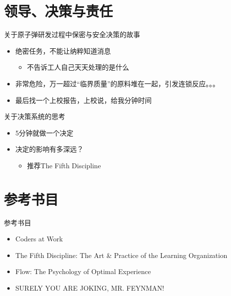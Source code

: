 \documentclass[presentation,dvipdfmx,CJKbookmarks]{beamer}
\begin{document}
\begin{CJK*}{UTF8}{simsun}
\section{领导、决策与责任}
\label{sec:orgb96292d}

\begin{frame}[label={sec:org31547c6}]{关于原子弹研发过程中保密与安全决策的故事}
\begin{itemize}
\item 绝密任务，不能让纳粹知道消息
\begin{itemize}
\item 不告诉工人自己天天处理的是什么
\end{itemize}
\item 非常危险，万一超过“临界质量”的原料堆在一起，引发连锁反应。。。
\item 最后找一个上校报告，上校说，给我\thinspace 分钟时间
\end{itemize}
\end{frame}

\begin{frame}[label={sec:org68d7a14}]{关于决策系统的思考}
\begin{itemize}
\item 5\thinspace 分钟就做一个决定
\item 决定的影响有多深远？

\begin{itemize}
\item 推荐\thinspace The Fifth Discipline
\end{itemize}
\end{itemize}
\end{frame}

\section{参考书目}
\label{sec:org377bb04}

\begin{frame}[label={sec:orgb37fd17}]{参考书目}
\begin{itemize}
\item Coders at Work
\item The Fifth Discipline: The Art \& Practice of the Learning Organization
\item Flow: The Psychology of Optimal Experience
\item SURELY YOU ARE JOKING, MR. FEYNMAN!
\end{itemize}
\end{frame}
\end{CJK*}
\end{document}
